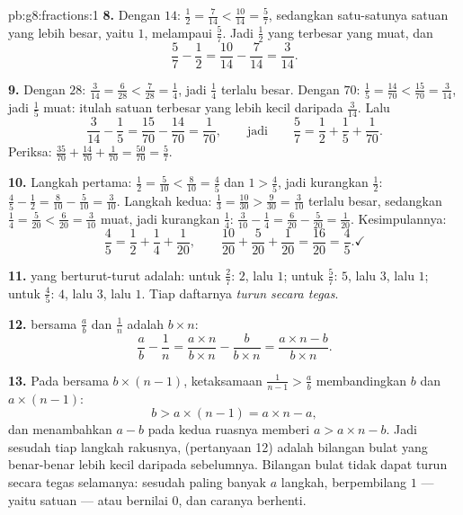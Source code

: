\begin{solution}{pb:g8:fractions:1}
\textbf{8.} Dengan  $14$: $\frac12 = \frac{7}{14} <
\frac{10}{14} = \frac57$, sedangkan satu-satunya  satuan yang
lebih besar, yaitu $1$, melampaui $\frac57$. Jadi $\frac12$ yang
terbesar yang muat, dan
\[
\frac57 - \frac12 = \frac{10}{14} - \frac{7}{14} = \frac{3}{14} .
\]

\textbf{9.} Dengan  $28$: $\frac{3}{14} = \frac{6}{28} <
\frac{7}{28} = \frac14$, jadi $\frac14$ terlalu besar. Dengan
 $70$: $\frac15 = \frac{14}{70} < \frac{15}{70} =
\frac{3}{14}$, jadi $\frac15$ muat: itulah  satuan terbesar
yang lebih kecil daripada $\frac{3}{14}$. Lalu
\[
\frac{3}{14} - \frac15 = \frac{15}{70} - \frac{14}{70}
= \frac{1}{70},
\qquad\text{jadi}\qquad
\frac57 = \frac12 + \frac15 + \frac{1}{70} .
\]
Periksa: $\frac{35}{70} + \frac{14}{70} + \frac{1}{70} =
\frac{50}{70} = \frac57$.

\textbf{10.} Langkah pertama: $\frac12 = \frac{5}{10} < \frac{8}{10} =
\frac45$ dan $1 > \frac45$, jadi kurangkan $\frac12$:
$\frac45 - \frac12 = \frac{8}{10} - \frac{5}{10} = \frac{3}{10}$.
Langkah kedua: $\frac13 = \frac{10}{30} > \frac{9}{30} =
\frac{3}{10}$ terlalu besar, sedangkan $\frac14 = \frac{5}{20} <
\frac{6}{20} = \frac{3}{10}$ muat, jadi kurangkan $\frac14$:
$\frac{3}{10} - \frac14 = \frac{6}{20} - \frac{5}{20} =
\frac{1}{20}$. Kesimpulannya:
\[
\frac45 = \frac12 + \frac14 + \frac{1}{20},
\qquad
\frac{10}{20} + \frac{5}{20} + \frac{1}{20} = \frac{16}{20}
= \frac45 . \checkmark
\]

\textbf{11.}   yang berturut-turut adalah:
untuk $\frac27$: $2$, lalu $1$; untuk $\frac57$: $5$, lalu $3$, lalu
$1$; untuk $\frac45$: $4$, lalu $3$, lalu $1$. Tiap daftarnya
\emph{turun secara tegas}.

\textbf{12.}  bersama $\frac ab$ dan $\frac1n$
adalah $b \times n$:
\[
\frac{a}{b} - \frac{1}{n}
= \frac{a \times n}{b \times n} - \frac{b}{b \times n}
= \frac{a \times n - b}{b \times n} .
\]

\textbf{13.} Pada  bersama $b \times (n-1)$, ketaksamaan
$\frac{1}{n-1} > \frac ab$ membandingkan 
$b$ dan $a \times (n - 1)$:
\[
b > a \times (n - 1) = a \times n - a ,
\]
dan menambahkan $a - b$ pada kedua ruasnya memberi
$a > a \times n - b$. Jadi sesudah tiap langkah rakusnya, 
 (pertanyaan 12) adalah bilangan bulat yang benar-benar lebih
kecil daripada sebelumnya. Bilangan bulat tidak dapat turun secara
tegas selamanya: sesudah paling banyak $a$ langkah, 
berpembilang $1$ --- yaitu  satuan --- atau bernilai
$0$, dan caranya berhenti.


\end{solution}
